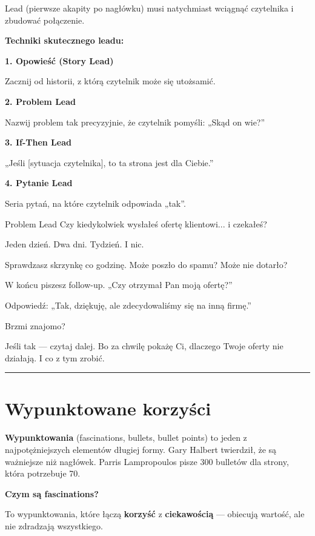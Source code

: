 \documentclass[
  12pt,
  a4paper,
  twoside,
  openright,
  12pt,
  DIV=12,
  BCOR=12mm]{scrbook}
\newcommand{\decoline}{%
  \begin{center}
    \textcolor{bordergray}{\rule{0.3\textwidth}{0.5pt}}
  \end{center}
}
\begin{document}
Lead (pierwsze akapity po nagłówku) musi natychmiast wciągnąć czytelnika
i zbudować połączenie.

\textbf{Techniki skutecznego leadu:}

\textbf{1. Opowieść (Story Lead)}

Zacznij od historii, z którą czytelnik może się utożsamić.

\textbf{2. Problem Lead}

Nazwij problem tak precyzyjnie, że czytelnik pomyśli: „Skąd on wie?''

\textbf{3. If-Then Lead}

„Jeśli {[}sytuacja czytelnika{]}, to ta strona jest dla Ciebie.''

\textbf{4. Pytanie Lead}

Seria pytań, na które czytelnik odpowiada „tak''.

\begin{przyklad}{Problem Lead}
Czy kiedykolwiek wysłałeś ofertę klientowi... i czekałeś?

Jeden dzień. Dwa dni. Tydzień. I nic.

Sprawdzasz skrzynkę co godzinę. Może poszło do spamu? Może nie dotarło?

W końcu piszesz follow-up. „Czy otrzymał Pan moją ofertę?”

Odpowiedź: „Tak, dziękuję, ale zdecydowaliśmy się na inną firmę.”

Brzmi znajomo?

Jeśli tak --- czytaj dalej. Bo za chwilę pokażę Ci, dlaczego Twoje oferty nie działają. I co z tym zrobić.
\end{przyklad}

\decoline

\section{Wypunktowane korzyści}\label{wypunktowane-korzyux15bci}

\textbf{Wypunktowania} (fascinations, bullets, bullet points) to jeden z
najpotężniejszych elementów długiej formy. Gary Halbert twierdził, że są
ważniejsze niż nagłówek. Parris Lampropoulos pisze 300 bulletów dla
strony, która potrzebuje 70.

\textbf{Czym są fascinations?}

To wypunktowania, które łączą \textbf{korzyść} z \textbf{ciekawością}
--- obiecują wartość, ale nie zdradzają wszystkiego.
\end{document}
